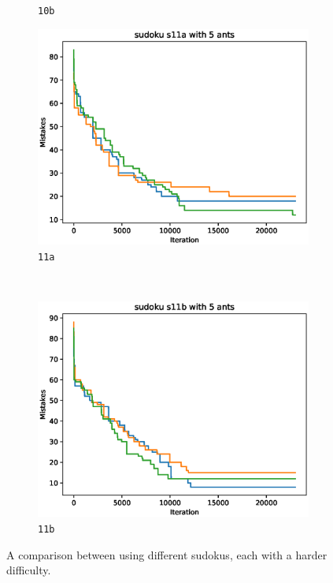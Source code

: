 \documentclass[11pt]{article}
\begin{document}
\begin{figure}[H]
\begin{subfigure}[t]{0.48\textwidth}
        \caption{\texttt{10b}}
        \label{fig:sudoku_10b}
    \end{subfigure} 
    
    \begin{subfigure}[t]{0.48\textwidth}
        \centering
        \includegraphics[width=\textwidth]{images/sudoku_11a_5.eps}
        \caption{\texttt{11a}}
        \label{fig:sudoku_11a}
    \end{subfigure}%
    ~
    \begin{subfigure}[t]{0.48\textwidth}
        \centering
        \includegraphics[width=\textwidth]{images/sudoku_11b_5.eps}
        \caption{\texttt{11b}}
        \label{fig:sudoku_11b}
    \end{subfigure}
    
    \caption{A comparison between using different sudokus, each with a harder difficulty.}
    \label{fig:sudokus}
\end{figure}
\end{document}
